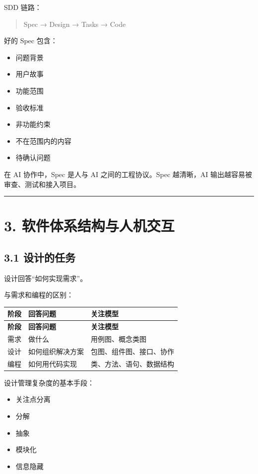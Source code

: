 \documentclass[UTF8,zihao=-4]{ctexart}
\begin{document}
SDD 链路：

\begin{quote}
Spec → Design → Tasks → Code
\end{quote}

好的 Spec 包含：

\begin{itemize}
\item 问题背景
\item 用户故事
\item 功能范围
\item 验收标准
\item 非功能约束
\item 不在范围内的内容
\item 待确认问题
\end{itemize}

在 AI 协作中，Spec 是人与 AI 之间的工程协议。Spec 越清晰，AI 输出越容易被审查、测试和接入项目。

\bigskip\hrule\bigskip

\section{3. 软件体系结构与人机交互}

\subsection{3.1 设计的任务}

设计回答“如何实现需求”。

与需求和编程的区别：

\begin{longtable}{|>{\raggedright\arraybackslash}p{}|>{\raggedright\arraybackslash}p{}|>{\raggedright\arraybackslash}p{}|}
\hline
\textbf{阶段} & \textbf{回答问题} & \textbf{关注模型} \\
\hline
\endfirsthead
\hline
\textbf{阶段} & \textbf{回答问题} & \textbf{关注模型} \\
\hline
\endhead
需求 & 做什么 & 用例图、概念类图 \\
\hline
设计 & 如何组织解决方案 & 包图、组件图、接口、协作 \\
\hline
编程 & 如何用代码实现 & 类、方法、语句、数据结构 \\
\hline
\end{longtable}

设计管理复杂度的基本手段：

\begin{itemize}
\item 关注点分离
\item 分解
\item 抽象
\item 模块化
\item 信息隐藏
\end{itemize}
\end{document}

